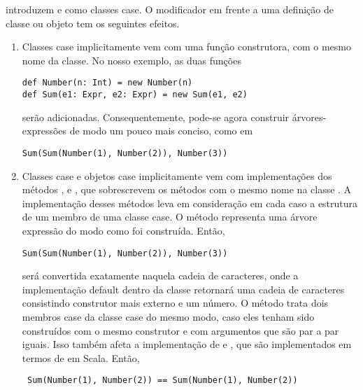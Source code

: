introduzem  e  como classes case.
O modificador  em frente a uma defini\c{c}\~{a}o de classe ou objeto tem 
os seguintes efeitos.
\begin{enumerate}
\item Classes case implicitamente vem com uma fun\c{c}\~{a}o construtora, com o mesmo nome da classe.
No nosso exemplo, as duas fun\c{c}\~{o}es
\begin{lstlisting}
def Number(n: Int) = new Number(n)
def Sum(e1: Expr, e2: Expr) = new Sum(e1, e2)
\end{lstlisting}

ser\~{a}o adicionadas. Consequentemente, pode-se agora construir \'{a}rvores-express\~{o}es de modo um 
pouco mais conciso, como em
\begin{lstlisting}
Sum(Sum(Number(1), Number(2)), Number(3))
\end{lstlisting} 
\item Classes case e objetos case implicitamente vem com implementa\c{c}\~{o}es dos m\'{e}todos 
,  e , que sobrescrevem os
m\'{e}todos com o mesmo nome na classe . A implementa\c{c}\~{a}o desses 
m\'{e}todos leva em considera\c{c}\~{a}o em cada caso a estrutura de um membro de uma classe 
case. O m\'{e}todo  representa uma \'{a}rvore express\~{a}o do modo como foi
constru\'{i}da. Ent\~{a}o,  
\begin{lstlisting}
Sum(Sum(Number(1), Number(2)), Number(3))
\end{lstlisting} 

ser\'{a} convertida exatamente naquela cadeia de caracteres, onde a implementa\c{c}\~{a}o 
default dentro da classe  retornar\'{a} uma cadeia de caracteres 
consistindo construtor  mais externo e um n\'{u}mero. O m\'{e}todo 
 trata dois membros case da classe case do mesmo modo, caso
eles tenham sido constru\'{i}dos com o mesmo construtor e com argumentos que 
s\~{a}o par a par iguais. Isso tamb\'{e}m afeta a implementa\c{c}\~{a}o de \code{==} e 
\code{!=}, que s\~{a}o implementados em termos de  em Scala. Ent\~{a}o,  
 \begin{lstlisting}
 Sum(Number(1), Number(2)) == Sum(Number(1), Number(2))
 \end{lstlisting}


\end{enumerate}
